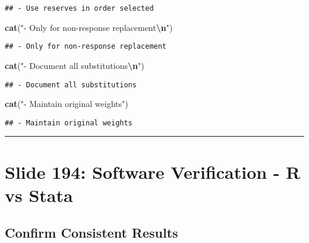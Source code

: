 \documentclass[
]{article}
\newenvironment{Shaded}{\begin{snugshade}}{\end{snugshade}}
\newcommand{\FunctionTok}[1]{\textcolor[rgb]{0.13,0.29,0.53}{\textbf{#1}}}
\newcommand{\NormalTok}[1]{#1}
\newcommand{\SpecialCharTok}[1]{\textcolor[rgb]{0.81,0.36,0.00}{\textbf{#1}}}
\newcommand{\StringTok}[1]{\textcolor[rgb]{0.31,0.60,0.02}{#1}}
\begin{document}
\begin{verbatim}
## - Use reserves in order selected
\end{verbatim}

\begin{Shaded}
\begin{Highlighting}[]
\FunctionTok{cat}\NormalTok{(}\StringTok{"{-} Only for non{-}response replacement}\SpecialCharTok{\textbackslash{}n}\StringTok{"}\NormalTok{)}
\end{Highlighting}
\end{Shaded}

\begin{verbatim}
## - Only for non-response replacement
\end{verbatim}

\begin{Shaded}
\begin{Highlighting}[]
\FunctionTok{cat}\NormalTok{(}\StringTok{"{-} Document all substitutions}\SpecialCharTok{\textbackslash{}n}\StringTok{"}\NormalTok{)}
\end{Highlighting}
\end{Shaded}

\begin{verbatim}
## - Document all substitutions
\end{verbatim}

\begin{Shaded}
\begin{Highlighting}[]
\FunctionTok{cat}\NormalTok{(}\StringTok{"{-} Maintain original weights"}\NormalTok{)}
\end{Highlighting}
\end{Shaded}

\begin{verbatim}
## - Maintain original weights
\end{verbatim}

\begin{center}\rule{0.5\linewidth}{0.5pt}\end{center}

\section{Slide 194: Software Verification - R vs
Stata}\label{slide-194-software-verification---r-vs-stata}

\subsection{Confirm Consistent
Results}\label{confirm-consistent-results}
\end{document}
